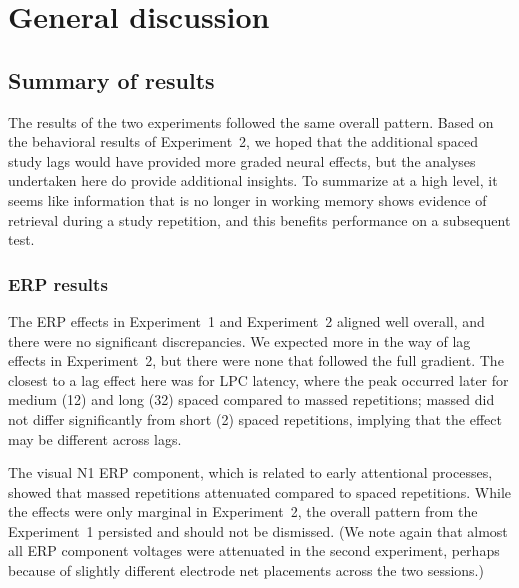 
\chapter{General discussion}


\section{Summary of results}


The results of the two experiments followed the same overall pattern.  Based on the behavioral results of Experiment~2, we hoped that the additional spaced study lags would have provided more graded neural effects, but the analyses undertaken here do provide additional insights.  To summarize at a high level, it seems like information that is no longer in working memory shows evidence of retrieval during a study repetition, and this benefits performance on a subsequent test.

\subsection{ERP results}


The ERP effects in Experiment~1 and Experiment~2 aligned well overall, and there were no significant discrepancies.  We expected more in the way of lag effects in Experiment~2, but there were none that followed the full gradient.  The closest to a lag effect here was for LPC latency, where the peak occurred later for medium (12) and long (32) spaced compared to massed repetitions; massed did not differ significantly from short (2) spaced repetitions, implying that the effect may be different across lags.


The visual N1 ERP component, which is related to early attentional processes, showed that massed repetitions attenuated compared to spaced repetitions.  While the effects were only marginal in Experiment~2, the overall pattern from the Experiment~1 persisted and should not be dismissed. (We note again that almost all ERP component voltages were attenuated in the second experiment, perhaps because of slightly different electrode net placements across the two sessions.)


